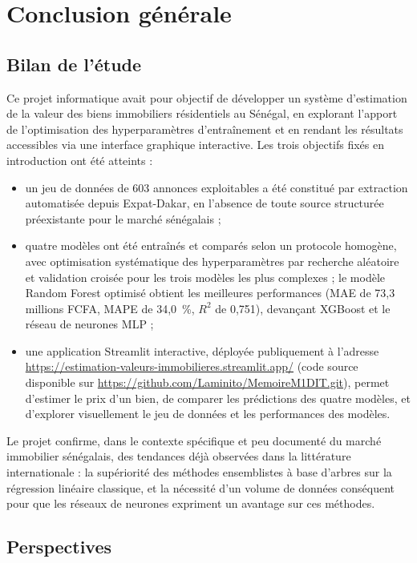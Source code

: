 \chapter{Conclusion générale}

\section{Bilan de l'étude}

Ce projet informatique avait pour objectif de développer un système d'estimation de la valeur
des biens immobiliers résidentiels au Sénégal, en explorant l'apport de l'optimisation des
hyperparamètres d'entraînement et en rendant les résultats accessibles via une interface
graphique interactive. Les trois objectifs fixés en introduction ont été atteints :

\begin{itemize}
  \item un jeu de données de 603 annonces exploitables a été constitué par extraction
  automatisée depuis Expat-Dakar, en l'absence de toute source structurée préexistante pour le
  marché sénégalais ;
  \item quatre modèles ont été entraînés et comparés selon un protocole homogène, avec
  optimisation systématique des hyperparamètres par recherche aléatoire et validation croisée
  pour les trois modèles les plus complexes ; le modèle Random Forest optimisé obtient les
  meilleures performances (MAE de 73,3 millions FCFA, MAPE de 34,0~\%, $R^2$ de 0,751),
  devançant XGBoost et le réseau de neurones MLP ;
  \item une application Streamlit interactive, déployée publiquement à l'adresse
  \url{https://estimation-valeurs-immobilieres.streamlit.app/} (code source disponible sur
  \url{https://github.com/Laminito/MemoireM1DIT.git}), permet d'estimer le prix d'un bien, de
  comparer les prédictions des quatre modèles, et d'explorer visuellement le jeu de données et
  les performances des modèles.
\end{itemize}

Le projet confirme, dans le contexte spécifique et peu documenté du marché immobilier
sénégalais, des tendances déjà observées dans la littérature internationale : la supériorité
des méthodes ensemblistes à base d'arbres sur la régression linéaire classique, et la nécessité
d'un volume de données conséquent pour que les réseaux de neurones expriment un avantage sur
ces méthodes.

\section{Perspectives}

